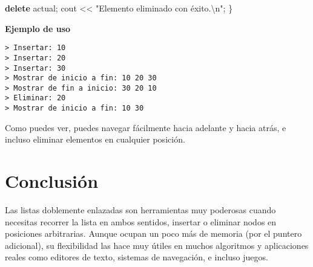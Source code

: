 \documentclass[
  11pt,
  a4paper,
  DIV=11,
  numbers=noendperiod]{scrreprt}
\newenvironment{Shaded}{\begin{snugshade}}{\end{snugshade}}
\newcommand{\KeywordTok}[1]{\textcolor[rgb]{0.00,0.23,0.31}{\textbf{#1}}}
\newcommand{\NormalTok}[1]{\textcolor[rgb]{0.00,0.23,0.31}{#1}}
\newcommand{\OperatorTok}[1]{\textcolor[rgb]{0.37,0.37,0.37}{#1}}
\newcommand{\SpecialCharTok}[1]{\textcolor[rgb]{0.37,0.37,0.37}{#1}}
\newcommand{\StringTok}[1]{\textcolor[rgb]{0.13,0.47,0.30}{#1}}
\begin{document}
\begin{Shaded}
\begin{Highlighting}[]
    \KeywordTok{delete}\NormalTok{ actual}\OperatorTok{;}
\NormalTok{    cout }\OperatorTok{\textless{}\textless{}} \StringTok{"Elemento eliminado con éxito.}\SpecialCharTok{\textbackslash{}n}\StringTok{"}\OperatorTok{;}
\OperatorTok{\}}
\end{Highlighting}
\end{Shaded}

\textbf{Ejemplo de uso}

\begin{tcolorbox}[custombox]
\begin{verbatim}
> Insertar: 10
> Insertar: 20
> Insertar: 30
> Mostrar de inicio a fin: 10 20 30
> Mostrar de fin a inicio: 30 20 10
> Eliminar: 20
> Mostrar de inicio a fin: 10 30
\end{verbatim}
\end{tcolorbox}

Como puedes ver, puedes navegar fácilmente hacia adelante y hacia atrás,
e incluso eliminar elementos en cualquier posición.

\section{Conclusión}\label{conclusiuxf3n}

Las listas doblemente enlazadas son herramientas muy poderosas cuando
necesitas recorrer la lista en ambos sentidos, insertar o eliminar nodos
en posiciones arbitrarias. Aunque ocupan un poco más de memoria (por el
puntero adicional), su flexibilidad las hace muy útiles en muchos
algoritmos y aplicaciones reales como editores de texto, sistemas de
navegación, e incluso juegos.
\end{document}

